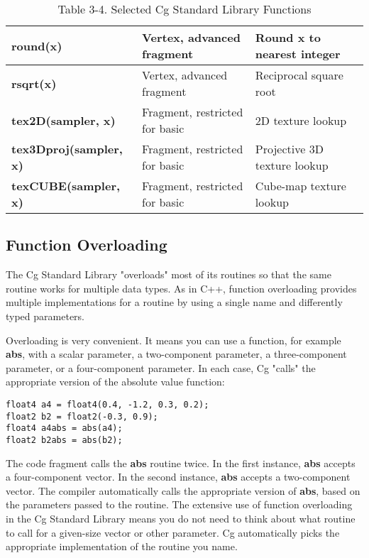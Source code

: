 \documentclass[../main.tex]{subfiles}
\begin{document}
\begin{table}
\begin{tabular}{ p{3cm} p{3cm} p{5cm}  }
\hline
\textbf{round(x)} & Vertex, advanced fragment & Round \textbf{x} to nearest integer \\
\hline
\textbf{rsqrt(x)} & Vertex, advanced fragment & Reciprocal square root \\
\hline
\textbf{tex2D(sampler, x)} & Fragment, restricted for basic & 2D texture lookup \\
\hline
\textbf{tex3Dproj(sampler, x)} & Fragment, restricted for basic & Projective 3D texture lookup \\
\hline
\textbf{texCUBE(sampler, x)} & Fragment, restricted for basic & Cube-map texture lookup \\
\hline
\end{tabular}

\caption{Table 3-4. Selected Cg Standard Library Functions}
\label{table:3-4}
\end{table}

\subsection*{Function Overloading}

The Cg Standard Library "overloads" most of its routines so that the same routine works for multiple data types. As in C++, function overloading provides multiple implementations for a routine by using a single name and differently typed parameters.

Overloading is very convenient. It means you can use a function, for example \textbf{abs}, with a scalar parameter, a two-component parameter, a three-component parameter, or a four-component parameter. In each case, Cg "calls" the appropriate version of the absolute value function:

\FloatBarrier
\begin{lstlisting}
float4 a4 = float4(0.4, -1.2, 0.3, 0.2);
float2 b2 = float2(-0.3, 0.9);
float4 a4abs = abs(a4);
float2 b2abs = abs(b2);
\end{lstlisting}
\FloatBarrier

The code fragment calls the \textbf{abs} routine twice. In the first instance, \textbf{abs} accepts a four-component vector. In the second instance, \textbf{abs} accepts a two-component vector. The compiler automatically calls the appropriate version of \textbf{abs}, based on the parameters passed to the routine. The extensive use of function overloading in the Cg Standard Library means you do not need to think about what routine to call for a given-size vector or other parameter. Cg automatically picks the appropriate implementation of the routine you name.
\end{document}
